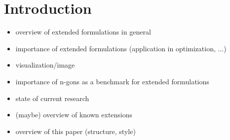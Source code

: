\section{Introduction} 

\begin{itemize}
  \item overview of extended formulations in general
  \item importance of extended formulations (application in optimization, ...)
  \item visualization/image
  \item importance of n-gons as a benchmark for extended formulations
  \item state of current research
  \item (maybe) overview of known extensions
  \item overview of this paper (structure, style)
\end{itemize}
